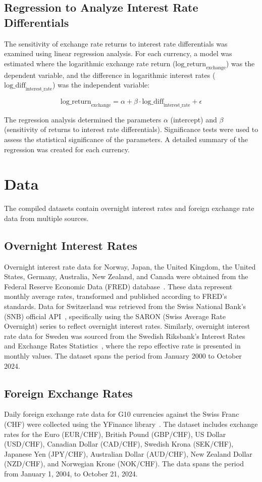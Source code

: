 \documentclass{article}
\begin{document}
\subsection{Regression to Analyze Interest Rate Differentials}

The sensitivity of exchange rate returns to interest rate differentials was examined using linear regression analysis. For each currency, a model was estimated where the logarithmic exchange rate return (\(\text{log\_return}_{\text{exchange}}\)) was the dependent variable, and the difference in logarithmic interest rates (\(\text{log\_diff}_{\text{interest\_rate}}\)) was the independent variable:

\[
\text{log\_return}_{\text{exchange}} = \alpha + \beta \cdot \text{log\_diff}_{\text{interest\_rate}} + \epsilon
\]

The regression analysis determined the parameters \(\alpha\) (intercept) and \(\beta\) (sensitivity of returns to interest rate differentials). Significance tests were used to assess the statistical significance of the parameters. A detailed summary of the regression was created for each currency.

\section{Data}
The compiled datasets contain overnight interest rates and foreign exchange rate data from multiple sources.

\subsection{Overnight Interest Rates}
Overnight interest rate data for Norway, Japan, the United Kingdom, the United States, Germany, Australia, New Zealand, and Canada were obtained from the Federal Reserve Economic Data (FRED) database~\cite{fred}. These data represent monthly average rates, transformed and published according to FRED's standards. Data for Switzerland was retrieved from the Swiss National Bank's (SNB) official API~\cite{snb}, specifically using the SARON (Swiss Average Rate Overnight) series to reflect overnight interest rates. Similarly, overnight interest rate data for Sweden was sourced from the Swedish Riksbank’s Interest Rates and Exchange Rates Statistics~\cite{riksbank}, where the repo effective rate is presented in monthly values. The dataset spans the period from January 2000 to October 2024.

\subsection{Foreign Exchange Rates}
Daily foreign exchange rate data for G10 currencies against the Swiss Franc (CHF) were collected using the YFinance library~\cite{yfinance}. The dataset includes exchange rates for the Euro (EUR/CHF), British Pound (GBP/CHF), US Dollar (USD/CHF), Canadian Dollar (CAD/CHF), Swedish Krona (SEK/CHF), Japanese Yen (JPY/CHF), Australian Dollar (AUD/CHF), New Zealand Dollar (NZD/CHF), and Norwegian Krone (NOK/CHF). The data spans the period from January 1, 2004, to October 21, 2024.
\end{document}
